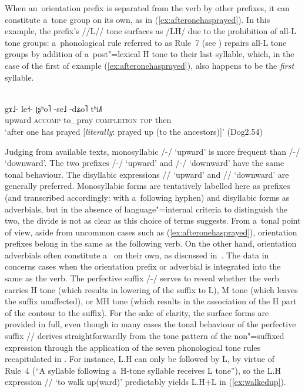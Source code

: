 When an~orientation prefix is separated from the verb by other prefixes, it can constitute a~tone
group on its own, as in (\ref{ex:afteronehasprayed}). In this example, the prefix's //L// tone surfaces as /LH/ due to the prohibition of all-L tone groups: a~{phonological rule} referred to as Rule~7 (see ) repairs all-L tone groups by addition of a~post"=lexical H tone to their last syllable, which, in the case of the first  of example (\ref{ex:afteronehasprayed}), also happens to be the \textit{first} syllable.
%
\begin{exe}
  \ex
  \label{ex:afteronehasprayed}
  \\
  \gll gɤ˩-		le˧-		ʈʂʰo˥	-se˩		-dʑo˥	tʰi˩˥\\
  upward		\textsc{accomp}	to\_pray	\textsc{completion}	\textsc{top}	then\\
  \glt ‘after one has prayed [\textit{literally}: prayed up (to the ancestors)]’ (Dog2.54)
\end{exe}

Judging from available texts, {monosyllabic} /-/ ‘upward’ is more
frequent than /-/ ‘downward’. The two prefixes /-/ ‘upward’ and /-/ ‘downward’ have the same tonal behaviour.
The disyllabic expressions //
‘upward’ and // ‘downward’ are generally preferred. Monosyllabic forms are tentatively
labelled here as prefixes (and transcribed accordingly: with a~following hyphen) and disyllabic forms
as adverbials, but in the absence of language"=internal criteria to distinguish the two, the divide
is not as clear as this choice of terms suggests. From a~tonal point of view, aside from uncommon cases such as (\ref{ex:afteronehasprayed}), orientation prefixes belong in the same  as the following verb. On the other hand, orientation adverbials often
constitute a~ on their own, as discussed in~. The data in  concerns cases when the orientation prefix or {adverbial} is integrated into the same  as the verb. The {perfective} suffix /-/ serves to reveal whether the verb carries H tone (which results in lowering of the suffix to L), M tone (which leaves the suffix unaffected), or MH tone (which results in the association of the H part of the contour to the suffix). For the sake of clarity, the surface forms are provided in full, even though in many cases the tonal behaviour of the {perfective} suffix \mbox{//} derives straightforwardly from the tone pattern of the non"=suffixed expression through the application of the seven phonological tone rules recapitulated in . For
instance, L.H can only be followed by L, by virtue of Rule~4 (“A syllable following a~H-tone syllable receives L tone''), so the L.H expression // ‘to walk up(ward)’ predictably yields L.H+L in (\ref{ex:walkedup}).

